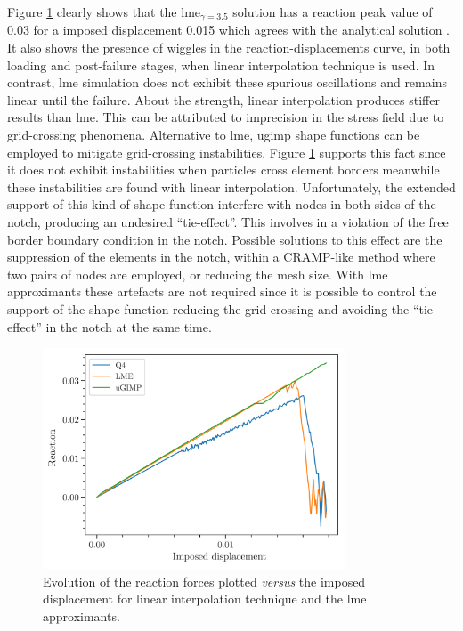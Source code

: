 \documentclass[preprint,12pt,a4paper]{elsarticle}
\begin{document}
Figure \ref{fig:Reactions-cracked-panel-mode-I} clearly shows that the
\acrshort{lme}$_{\gamma = 3.5}$ solution has a reaction peak value of 0.03 for a imposed displacement 0.015 which agrees with the
analytical solution \cite{Pandolfi_2012}. It also shows the presence
of wiggles in the reaction-displacements curve, in both loading and
post-failure stages, when linear interpolation technique is used. In
contrast, \acrshort{lme} simulation does not exhibit these spurious
oscillations and remains linear until the failure. About the strength,
linear interpolation produces stiffer results than \acrshort{lme}. This can be attributed to imprecision in the
stress field due to grid-crossing phenomena. Alternative to
  \acrshort{lme}, \acrshort{ugimp} shape
functions can be employed to mitigate grid-crossing instabilities.
Figure \ref{fig:Reactions-cracked-panel-mode-I} supports this fact since it
does not exhibit instabilities when particles cross element borders meanwhile these instabilities are found with linear interpolation. Unfortunately, the extended support of this
kind of shape function interfere with nodes in both sides of the notch,
producing an undesired ``tie-effect''. This involves in a violation of
the free border boundary condition in the notch. Possible solutions to this effect
are the suppression of the elements in the notch, within a CRAMP-like
method where two pairs of nodes are employed, or reducing the mesh size. With \acrshort{lme}
approximants these artefacts are not required since it is possible to control the support
of the shape function reducing the grid-crossing and avoiding the
``tie-effect'' in the notch at the same time.\\
\begin{figure}
  \centering
  \includegraphics[width=0.8\textwidth]{Figure-Reactions-Mode-I}
  \caption{Evolution of the reaction forces plotted \textit{versus}
    the imposed displacement for linear interpolation technique and
    the \acrshort{lme} approximants.}
  \label{fig:Reactions-cracked-panel-mode-I}
\end{figure}
\end{document}
